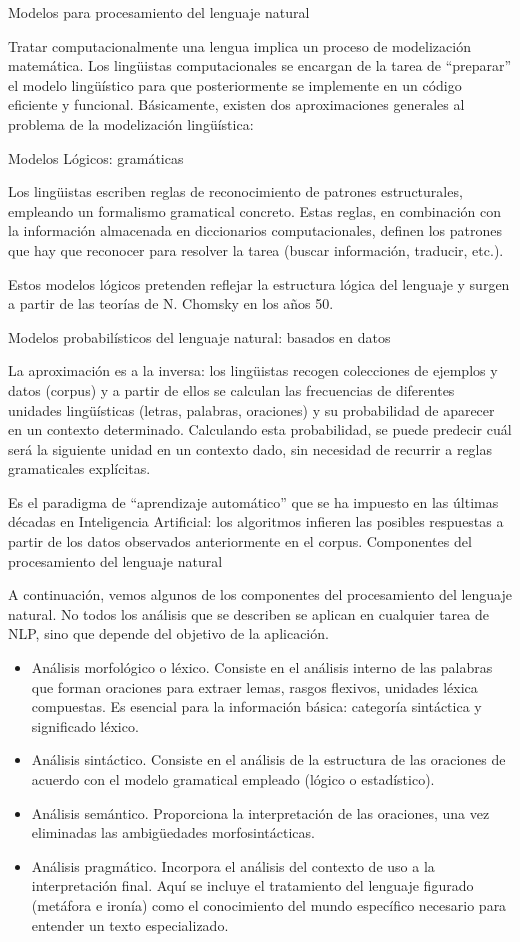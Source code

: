 \documentclass[runningheads]{llncs}
\begin{document}
Modelos para procesamiento del lenguaje natural

Tratar computacionalmente una lengua implica un proceso de modelización matemática. Los lingüistas computacionales se encargan de la tarea de “preparar” el modelo lingüístico para que posteriormente se implemente en un código eficiente y funcional. Básicamente, existen dos aproximaciones generales al problema de la modelización lingüística:

Modelos Lógicos: gramáticas

Los lingüistas escriben reglas de reconocimiento de patrones estructurales, empleando un formalismo gramatical concreto. Estas reglas, en combinación con la información almacenada en diccionarios computacionales, definen los patrones que hay que reconocer para resolver la tarea (buscar información, traducir, etc.).

Estos modelos lógicos pretenden reflejar la estructura lógica del lenguaje y surgen a partir de las teorías de N. Chomsky en los años 50. 


Modelos probabilísticos del lenguaje natural: basados en datos

La aproximación es a la inversa: los lingüistas recogen colecciones de ejemplos y datos (corpus) y a partir de ellos se calculan las frecuencias de diferentes unidades lingüísticas (letras, palabras, oraciones) y su probabilidad de aparecer en un contexto determinado. Calculando esta probabilidad, se puede predecir cuál será la siguiente unidad en un contexto dado, sin necesidad de recurrir a reglas gramaticales explícitas.

Es el paradigma de “aprendizaje automático” que se ha impuesto en las últimas décadas en Inteligencia Artificial: los algoritmos infieren las posibles respuestas a partir de los datos observados anteriormente en el corpus.
Componentes del procesamiento del lenguaje natural

A continuación, vemos algunos de los componentes del procesamiento del lenguaje natural. No todos los análisis que se describen se aplican en cualquier tarea de NLP, sino que depende del objetivo de la aplicación.

\begin{itemize}
    \item Análisis morfológico o léxico. Consiste en el análisis interno de las palabras que forman oraciones para extraer lemas, rasgos flexivos, unidades léxica compuestas. Es esencial para la información básica: categoría sintáctica y significado léxico.
    \item Análisis sintáctico. Consiste en el análisis de la estructura de las oraciones de acuerdo con el modelo gramatical empleado (lógico o estadístico).
    \item Análisis semántico. Proporciona la interpretación de las oraciones, una vez eliminadas las ambigüedades morfosintácticas.
    \item Análisis pragmático. Incorpora el análisis del contexto de uso a la interpretación final. Aquí se incluye el tratamiento del lenguaje figurado (metáfora e ironía) como el conocimiento del mundo específico necesario para entender un texto especializado.
\end{itemize}
\end{document}
